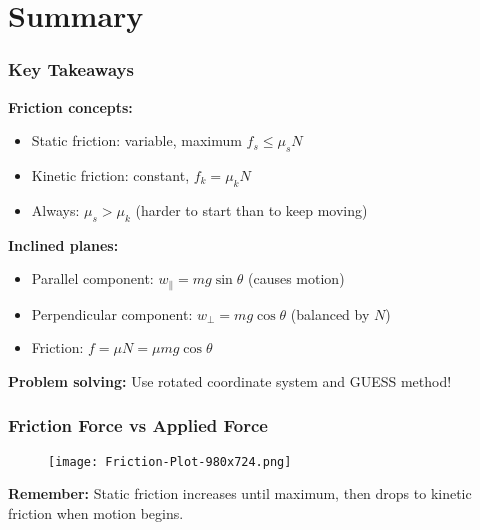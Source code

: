 \documentclass{beamer}
\begin{document}
\section{Summary}

\begin{frame}
\frametitle{Key Takeaways}
\textbf{Friction concepts:}
\begin{itemize}
    \item Static friction: variable, maximum $f_s \leq \mu_s N$
    \pause
    \item Kinetic friction: constant, $f_k = \mu_k N$
    \pause
    \item Always: $\mu_s > \mu_k$ (harder to start than to keep moving)
\end{itemize}

\pause
\vspace{0.5em}
\textbf{Inclined planes:}
\begin{itemize}
    \item Parallel component: $w_\parallel = mg\sin\theta$ (causes motion)
    \pause
    \item Perpendicular component: $w_\perp = mg\cos\theta$ (balanced by $N$)
    \pause
    \item Friction: $f = \mu N = \mu mg\cos\theta$
\end{itemize}

\pause
\vspace{0.5em}
\textbf{Problem solving:} Use rotated coordinate system and GUESS method!
\end{frame}

\begin{frame}
\frametitle{Friction Force vs Applied Force}
\begin{figure}[H]
    \centering
    \texttt{[image: Friction-Plot-980x724.png]}
\end{figure}

\textbf{Remember:} Static friction increases until maximum, then drops to kinetic friction when motion begins.
\end{frame}
\end{document}

